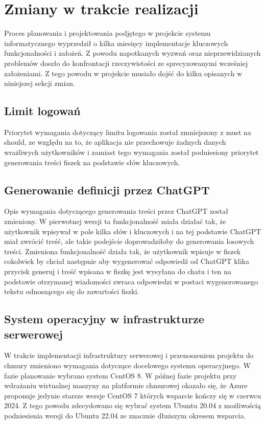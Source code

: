 \section{Zmiany w trakcie realizacji}
Proces planowania i projektowania podjętego w projekcie systemu informatycznego wyprzedził o kilka miesięcy implementacje kluczowych funkcjonalności i założeń. Z powodu napotkanych wyzwań oraz nieprzewidzianych problemów doszło do konfrontacji rzeczywistości ze sprecyzowanymi wcześniej założeniami. Z tego powodu w projekcie musiało dojść do kilku opisanych w niniejszej sekcji zmian.

\subsection{Limit logowań}
Priorytet wymagania dotyczący limitu logowania został zmniejszony z must na should, ze względu na to, że aplikacja nie przechowuje żadnych danych wrażliwych użytkowników i zamiast tego wymagania został podniesiony priorytet generowania treści fiszek na podstawie słów kluczowych.

\subsection{Generowanie definicji przez ChatGPT}
Opis wymagania dotyczącego generowania treści przez ChatGPT został zmieniony. W pierwotnej wersji ta funkcjonalność miała działać tak, że użytkownik wpisywał w pole kilka słów i kluczowych i na tej podstawie ChatGPT miał zwrócić treść, ale takie podejście doprowadziłoby do generowania losowych treści. Zmieniona funkcjonalność działa tak, że użytkownik wpisuje w fiszek cokolwiek by chciał następnie aby wygenerować odpowiedź od ChatGPT klika przycisk generuj i treść wpisana w fiszkę jest wysyłana do chatu i ten na podstawie otrzymanej wiadomości zwraca odpowiedzi w postaci wygenerowanego tekstu odnoszącego się do zawartości fiszki.

\subsection{System operacyjny w infrastrukturze serwerowej}
W trakcie implementacji infrastruktury serwerowej i przenoszeniem projektu do chmury zmieniono wymagania dotyczące docelowego systemu operacyjnego. W fazie planowanie wybrano system CentOS 8. W późnej fazie projektu przy wdrażaniu wirtualnej maszyny na platformie chmurowej okazało się, że Azure proponuje jedynie starsze wersje CentOS 7 których wsparcie kończy się w czerwcu 2024. Z tego powodu zdecydowano się wybrać system Ubuntu 20.04 z możliwością podniesienia wersji do Ubuntu 22.04 ze znacznie dłuższym okresem wsparcia.


